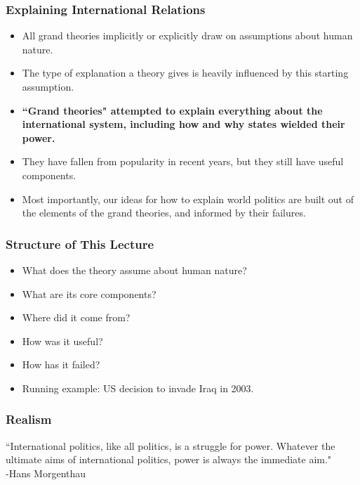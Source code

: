 \documentclass[handout]{beamer}
\begin{document}
\begin{frame} 
	\frametitle{\LARGE{Explaining International Relations}}
	\begin{itemize}
	    \item All grand theories implicitly or explicitly draw on assumptions about human nature. \pause
	    \item The type of explanation a theory gives is heavily influenced by this starting assumption. \pause
	    \item \textbf{``Grand theories" attempted to explain everything about the international system, including how and why states wielded their power.} \pause
	    \item They have fallen from popularity in recent years, but they still have useful components. \pause
	    \item Most importantly, our ideas for how to explain world politics are built out of the elements of the grand theories, and informed by their failures.   
	\end{itemize}  
\end{frame}

\begin{frame} 
	\frametitle{\LARGE{Structure of This Lecture}}
	\begin{itemize}
	    \item What does the theory assume about human nature? \pause
	    \item What are its core components? \pause
	    \item Where did it come from? \pause
	    \item How was it useful? \pause
	    \item How has it failed? \pause
	    \item Running example: US decision to invade Iraq in 2003.
	\end{itemize}	  
\end{frame}



\begin{frame} 
\frametitle{\LARGE{Realism}}
``International politics, like all politics, is a struggle for power. Whatever the ultimate aims of international politics, power is always the immediate aim." \\
\hspace*{160pt} -Hans Morgenthau
\end{frame}
\end{document}
